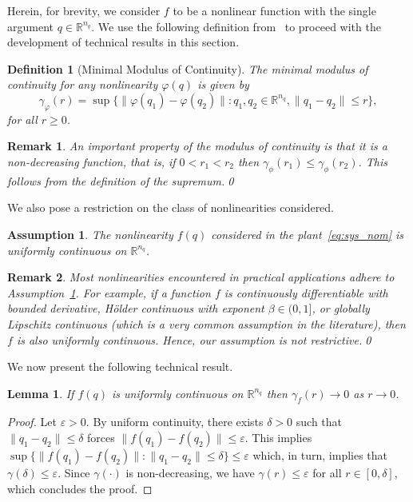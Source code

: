 \documentclass[times, doublespace]{rncauth}
\newtheorem{lemma}{Lemma}
\newtheorem{definition}{Definition}
\newtheorem{assumption}{Assumption}
\newtheorem{remark}{Remark}
\begin{document}
Herein, for brevity, we consider $f$ to be a nonlinear function with the single argument $q\in\mathbb{R}^{n_q}$. We use the following definition from~\cite[p. 406]{Aronszajn1956} to proceed with the development of technical results in this section. 
\begin{definition}[Minimal Modulus of Continuity]
	The minimal modulus of continuity for any nonlinearity $\varphi(q)$ is given by
	$$
	\gamma_\varphi(r)=\sup\{\|\varphi(q_1)-\varphi(q_2)\| : q_1, q_2\in\mathbb{R}^{n_q}, \|q_1-q_2\|\le r\},
	$$ 
	for all $r\ge 0$.
\end{definition}
\begin{remark}\label{rk:mod_of_cont_dec}
	An important property of the modulus of continuity is that it is a non-decreasing function, that is, if $0<r_1<r_2$ then $\gamma_\phi(r_1)\le\gamma_\phi(r_2)$. This follows from the definition of the supremum.\qed
	\end{remark}
We also pose a restriction on the class of nonlinearities considered.
\begin{assumption}\label{ass:uc_r_to_zero}
	The nonlinearity $f(q)$ considered in the plant~\eqref{eq:sys_nom} is uniformly continuous on $\mathbb{R}^{n_q}$.
\end{assumption}

\begin{remark}\label{rk:unif_cont}
	Most nonlinearities encountered in practical applications adhere to Assumption~\ref{ass:uc_r_to_zero}.
	For example, if a function $f$ is continuously differentiable with bounded derivative, H\"older continuous with exponent $\beta\in (0,1]$, or globally Lipschitz continuous (which is a very common assumption in the literature), then $f$ is also uniformly continuous. Hence, our assumption is not restrictive.\qed
	\end{remark}
We now present the following technical result.
\begin{lemma}\label{lem:4}
	If $f(q)$ is uniformly continuous on $\mathbb{R}^{n_q}$ then $\gamma_f(r) \to 0$ as $r\to 0$.
\end{lemma}
\begin{proof}
	Let $\varepsilon>0$. By uniform continuity, there exists $\delta>0$ such that $\|q_1-q_2\|\le \delta$ forces $\|f(q_1)-f(q_2)\|\le \varepsilon$. This implies $\sup \{\|f(q_1)-f(q_2)\| : \|q_1-q_2\|\le \delta\}\le \varepsilon$ which, in turn, implies that $\gamma(\delta)\le \varepsilon$. Since $\gamma(\cdot)$ is non-decreasing, we have $\gamma(r)\le \varepsilon$ for all $r\in [0,\delta]$, which concludes the proof.
\end{proof}
\end{document}
